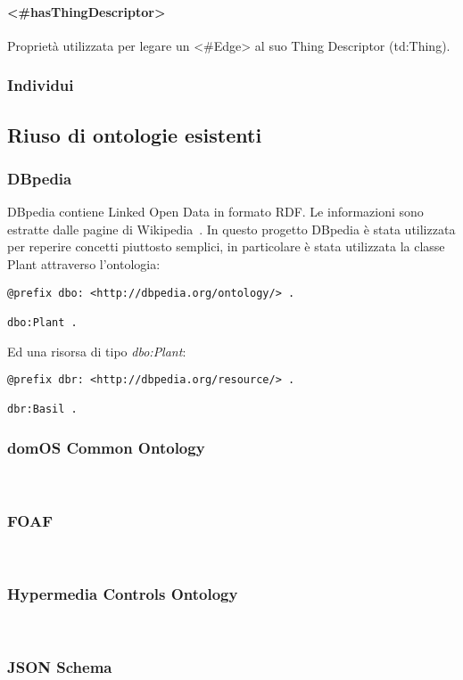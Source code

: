 \paragraph{<\#hasThingDescriptor>}
Proprietà utilizzata per legare un <\#Edge> al suo Thing Descriptor (td:Thing).

\subsubsection{Individui}

\subsection{Riuso di ontologie esistenti}
\subsubsection{DBpedia}
DBpedia contiene Linked Open Data in formato RDF. Le informazioni sono estratte dalle pagine di Wikipedia~\cite{wwwdbped0:online}.
In questo progetto DBpedia è stata utilizzata per reperire concetti piuttosto semplici, in particolare è stata utilizzata la classe Plant attraverso l'ontologia:
\begin{verbatim}
@prefix dbo: <http://dbpedia.org/ontology/> .

dbo:Plant .
\end{verbatim}
Ed una risorsa di tipo \textit{dbo:Plant}:
\begin{verbatim}
@prefix dbr: <http://dbpedia.org/resource/> .

dbr:Basil .
\end{verbatim}

\subsubsection{domOS Common Ontology}
~\cite{domOSCom57:online}
\subsubsection{FOAF}
~\cite{FOAFVoca16:online}
\subsubsection{Hypermedia Controls Ontology}
~\cite{Hypermed84:online}
\subsubsection{JSON Schema}
~\cite{JSONSche6:online}
